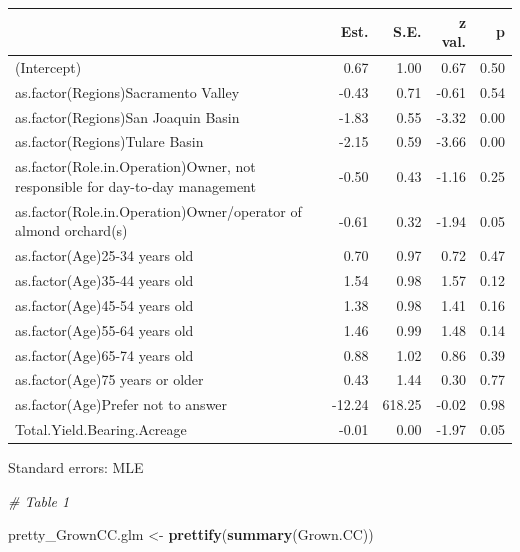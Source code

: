 \documentclass[12pt,]{article}
\newenvironment{Shaded}{\begin{snugshade}}{\end{snugshade}}
\newcommand{\KeywordTok}[1]{\textcolor[rgb]{0.13,0.29,0.53}{\textbf{#1}}}
\newcommand{\StringTok}[1]{\textcolor[rgb]{0.31,0.60,0.02}{#1}}
\newcommand{\CommentTok}[1]{\textcolor[rgb]{0.56,0.35,0.01}{\textit{#1}}}
\newcommand{\NormalTok}[1]{#1}
\begin{document}
\begin{table}[!h]
\centering
\begin{threeparttable}
\begin{tabular}{lrrrr}
\toprule
  & Est. & S.E. & z val. & p\\
\midrule
\rowcolor{gray!6}  (Intercept) & 0.67 & 1.00 & 0.67 & 0.50\\
as.factor(Regions)Sacramento Valley & -0.43 & 0.71 & -0.61 & 0.54\\
\rowcolor{gray!6}  as.factor(Regions)San Joaquin Basin & -1.83 & 0.55 & -3.32 & 0.00\\
as.factor(Regions)Tulare Basin & -2.15 & 0.59 & -3.66 & 0.00\\
\rowcolor{gray!6}  as.factor(Role.in.Operation)Owner, not responsible for day-to-day management & -0.50 & 0.43 & -1.16 & 0.25\\
\addlinespace
as.factor(Role.in.Operation)Owner/operator of almond orchard(s) & -0.61 & 0.32 & -1.94 & 0.05\\
\rowcolor{gray!6}  as.factor(Age)25-34 years old & 0.70 & 0.97 & 0.72 & 0.47\\
as.factor(Age)35-44 years old & 1.54 & 0.98 & 1.57 & 0.12\\
\rowcolor{gray!6}  as.factor(Age)45-54 years old & 1.38 & 0.98 & 1.41 & 0.16\\
as.factor(Age)55-64 years old & 1.46 & 0.99 & 1.48 & 0.14\\
\addlinespace
\rowcolor{gray!6}  as.factor(Age)65-74 years old & 0.88 & 1.02 & 0.86 & 0.39\\
as.factor(Age)75 years or older & 0.43 & 1.44 & 0.30 & 0.77\\
\rowcolor{gray!6}  as.factor(Age)Prefer not to answer & -12.24 & 618.25 & -0.02 & 0.98\\
Total.Yield.Bearing.Acreage & -0.01 & 0.00 & -1.97 & 0.05\\
\bottomrule
\end{tabular}
\begin{tablenotes}
\item Standard errors: MLE
\end{tablenotes}
\end{threeparttable}
\end{table}

\begin{Shaded}
\begin{Highlighting}[]
\CommentTok{# Table 1}

\NormalTok{pretty_GrownCC.glm <-}\StringTok{ }\KeywordTok{prettify}\NormalTok{(}\KeywordTok{summary}\NormalTok{(Grown.CC))}
\end{Highlighting}
\end{Shaded}
\end{document}
